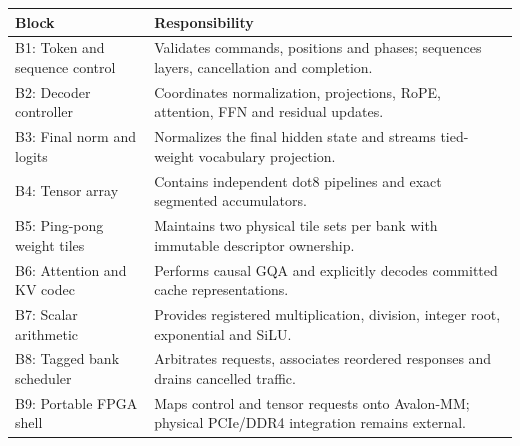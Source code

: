 \documentclass[11pt,a4paper]{article}
\begin{document}
{\small\renewcommand{\arraystretch}{1.18}\begin{longtable}{@{}L{0.24\textwidth}|L{0.7\textwidth}@{}}\toprule

\textbf{Block} & \textbf{Responsibility}\\\midrule\endhead

B1: Token and sequence control & Validates commands,\allowbreak{} positions and phases; sequences layers,\allowbreak{} cancellation and completion.\\[2pt]\hline

B2: Decoder controller & Coordinates normalization,\allowbreak{} projections,\allowbreak{} RoPE,\allowbreak{} attention,\allowbreak{} FFN and residual updates.\\[2pt]\hline

B3: Final norm and logits & Normalizes the final hidden state and streams tied-weight vocabulary projection.\\[2pt]\hline

B4: Tensor array & Contains independent dot8 pipelines and exact segmented accumulators.\\[2pt]\hline

B5: Ping-pong weight tiles & Maintains two physical tile sets per bank with immutable descriptor ownership.\\[2pt]\hline

B6: Attention and KV codec & Performs causal GQA and explicitly decodes committed cache representations.\\[2pt]\hline

B7: Scalar arithmetic & Provides registered multiplication,\allowbreak{} division,\allowbreak{} integer root,\allowbreak{} exponential and SiLU.\\[2pt]\hline

B8: Tagged bank scheduler & Arbitrates requests,\allowbreak{} associates reordered responses and drains cancelled traffic.\\[2pt]\hline

B9: Portable FPGA shell & Maps control and tensor requests onto Avalon-MM; physical PCIe/\allowbreak{}DDR4 integration remains external.\\[2pt]\hline

\bottomrule\end{longtable}}
\end{document}
